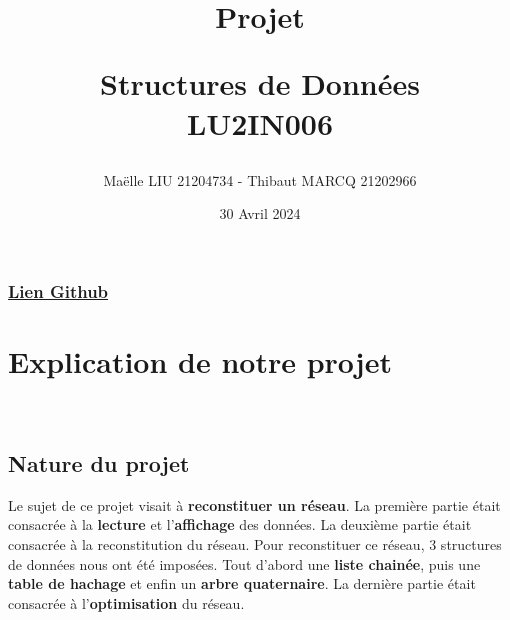 \documentclass[12pt]{extarticle}
\title{\textbf{Projet} 

Structures de Données\\
LU2IN006 }
\author{Maëlle LIU 21204734 - Thibaut MARCQ 21202966}
\date{30 Avril 2024}
\begin{document}
\maketitle

\subsubsection*{\href{https://github.com/thibautmarcq/Projet-SDD}{Lien Github}}

\renewcommand*\contentsname{Sommaire}
\tableofcontents

\newpage
\section*{Explication de notre projet}
\\ 
\subsection*{Nature du projet}

Le sujet de ce projet visait à \textbf{reconstituer un réseau}. La première partie était consacrée à la \textbf{lecture}  et l'\textbf{affichage} des données. La deuxième partie était consacrée à la reconstitution du réseau. Pour reconstituer ce réseau, 3 structures de données nous ont été imposées. Tout d'abord  une \textbf{liste chainée}, puis une \textbf{table de hachage} et enfin un \textbf{arbre quaternaire}. La dernière partie était consacrée à l'\textbf{optimisation} du réseau.
\\
\end{document}
